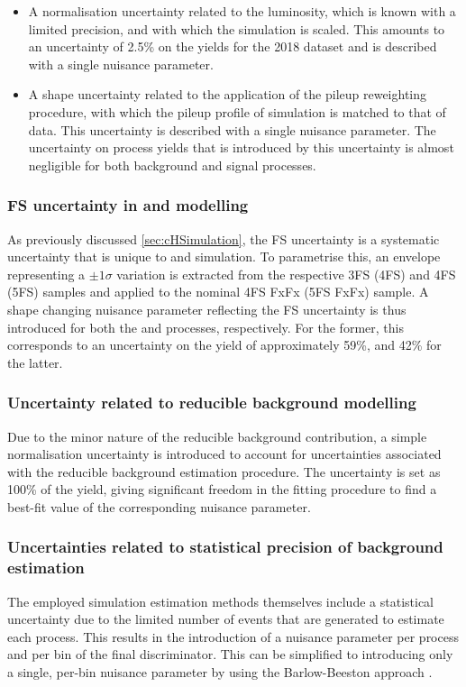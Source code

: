 \begin{itemize}
    \item A normalisation uncertainty related to the luminosity, which is known with a limited precision, and with which the simulation is scaled. This amounts to an uncertainty of 2.5\% on the yields for the 2018 dataset \cite{CMSLumi} and is described with a single nuisance parameter. 
    \item A shape uncertainty related to the application of the pileup reweighting procedure, with which the pileup profile of simulation is matched to that of data. This uncertainty is described with a single nuisance parameter. The uncertainty on process yields that is introduced by this uncertainty is almost negligible for both background and signal processes.
\end{itemize}
\subsubsection{FS uncertainty in \cHZZsen and \bHZZ modelling}
As previously discussed \autoref{sec:cHSimulation}, the FS uncertainty is a systematic uncertainty that is unique to \cHZZsen and \bHZZ simulation. To parametrise this, an envelope representing a $\pm 1\sigma$ variation is extracted from the respective 3FS (4FS) and 4FS (5FS) samples and applied to the nominal \cHZZ 4FS FxFx (\bHZZ 5FS FxFx) sample. A shape changing nuisance parameter reflecting the FS uncertainty is thus introduced for both the \cHZZsen and \bHZZ processes, respectively. For the former, this corresponds to an uncertainty on the yield of approximately 59\%, and 42\% for the latter. 
\subsubsection{Uncertainty related to reducible background modelling}
Due to the minor nature of the reducible background contribution, a simple normalisation uncertainty is introduced to account for uncertainties associated with the reducible background estimation procedure. The uncertainty is set as 100\% of the yield, giving significant freedom in the fitting procedure to find a best-fit value of the corresponding nuisance parameter.
\subsubsection{Uncertainties related to statistical precision of background estimation}
The employed simulation estimation methods themselves include a statistical uncertainty due to the limited number of events that are generated to estimate each process. This results in the introduction of a nuisance parameter per process and per bin of the final discriminator. This can be simplified to introducing only a single, per-bin nuisance parameter by using the Barlow-Beeston approach \cite{BARLOW}\cite{MCAutoStats}.

